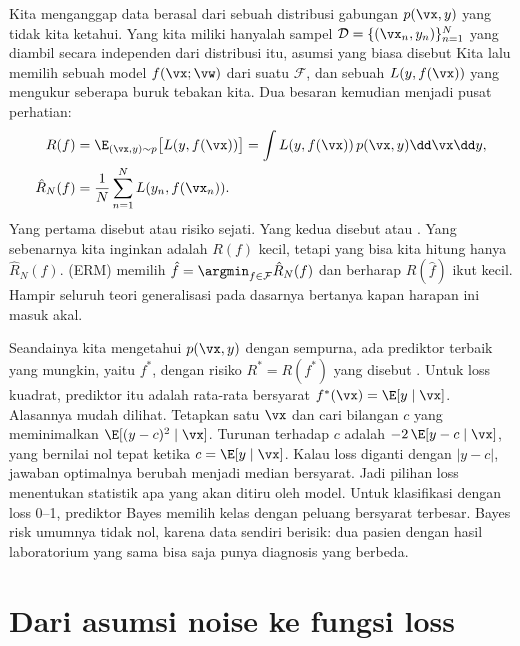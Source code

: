 Kita menganggap data berasal dari sebuah distribusi gabungan $p(\vx,y)$ yang tidak kita ketahui.
Yang kita miliki hanyalah sampel $\mathcal{D}=\{(\vx_n,y_n)\}_{n=1}^N$ yang diambil secara
independen dari distribusi itu, asumsi yang biasa disebut  Kita lalu memilih sebuah
model $f(\vx;\vw)$ dari suatu  $\mathcal{F}$, dan sebuah 
$L(y,f(\vx))$ yang mengukur seberapa buruk tebakan kita. Dua besaran kemudian menjadi pusat
perhatian:
\begin{align}
R(f) &= \E_{(\vx,y)\sim p}\big[L(y,f(\vx))\big] = \int L(y,f(\vx))\,p(\vx,y)\dd\vx\dd y, \label{eq:risk}\\
\hat R_N(f) &= \frac1N\sum_{n=1}^N L(y_n,f(\vx_n)). \label{eq:emprisk}
\end{align}
Yang pertama disebut  atau risiko sejati. Yang kedua disebut
 atau . Yang sebenarnya kita inginkan adalah $R(f)$
kecil, tetapi yang bisa kita hitung hanya $\hat R_N(f)$. 
(ERM) memilih $\hat f=\argmin_{f\in\mathcal{F}}\hat R_N(f)$ dan berharap $R(\hat f)$ ikut kecil.
Hampir seluruh teori generalisasi pada dasarnya bertanya kapan harapan ini masuk akal.

Seandainya kita mengetahui $p(\vx,y)$ dengan sempurna, ada prediktor terbaik yang mungkin, yaitu
 $f^*$, dengan risiko $R^*=R(f^*)$ yang disebut .
Untuk loss kuadrat, prediktor itu adalah rata-rata bersyarat $f^*(\vx)=\E[y\mid\vx]$. Alasannya
mudah dilihat. Tetapkan satu $\vx$ dan cari bilangan $c$ yang meminimalkan $\E[(y-c)^2\mid\vx]$.
Turunan terhadap $c$ adalah $-2\,\E[y-c\mid\vx]$, yang bernilai nol tepat ketika $c=\E[y\mid\vx]$.
Kalau loss diganti dengan $|y-c|$, jawaban optimalnya berubah menjadi median bersyarat. Jadi
pilihan loss menentukan statistik apa yang akan ditiru oleh model. Untuk klasifikasi dengan
loss 0--1, prediktor Bayes memilih kelas dengan peluang bersyarat terbesar. Bayes risk umumnya
tidak nol, karena data sendiri berisik: dua pasien dengan hasil laboratorium yang sama bisa saja
punya diagnosis yang berbeda.

\section{Dari asumsi noise ke fungsi loss}

